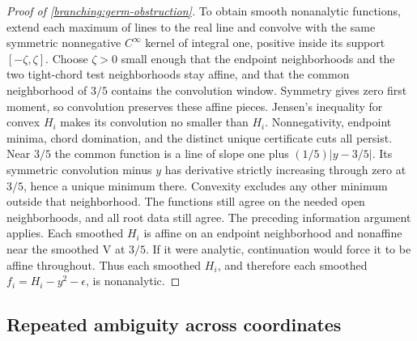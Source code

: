 \begin{proof}[Proof of \cref{branching:germ-obstruction}]
To obtain smooth nonanalytic functions, extend each maximum of lines
to the real line and convolve with the same symmetric nonnegative
$C^\infty$ kernel of integral one, positive inside its support
$[-\zeta,\zeta]$. Choose $\zeta>0$ small enough that the endpoint
neighborhoods and the two tight-chord test neighborhoods stay affine,
and that the common neighborhood of $3/5$ contains the convolution
window. Symmetry gives zero first moment, so convolution preserves
these affine pieces. Jensen's inequality for convex $H_i$ makes its
convolution no smaller than $H_i$. Nonnegativity, endpoint minima,
chord domination, and the distinct unique certificate cuts all persist.
Near $3/5$ the common function is a line of slope one plus
$(1/5)|y-3/5|$. Its symmetric convolution minus $y$ has derivative
strictly increasing through zero at $3/5$, hence a unique minimum
there. Convexity excludes any other minimum outside that neighborhood.
The functions still agree on the needed open neighborhoods, and all
root data still agree. The preceding information argument applies.
Each smoothed $H_i$ is affine on an endpoint neighborhood and nonaffine
near the smoothed V at $3/5$. If it were analytic, continuation would
force it to be affine throughout. Thus each smoothed $H_i$, and therefore
each smoothed $f_i=H_i-y^2-\epsilon$, is nonanalytic.
\end{proof}

\subsection{Repeated ambiguity across coordinates}
\label{app:branching-dimension}

